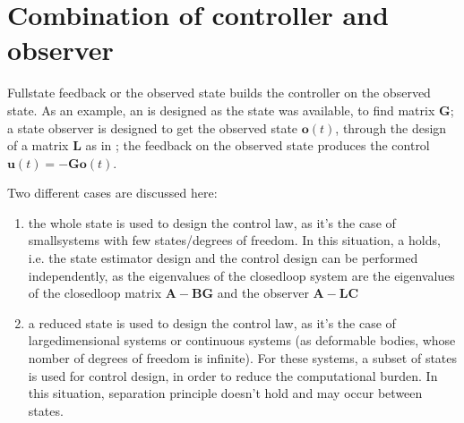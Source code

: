 \documentclass[letterpaper,10pt,english]{jupyterBook}
\begin{document}
\section{Combination of controller and observer}
\label{\detokenize{ch/control/optimal-control-regulator-observer:combination-of-controller-and-observer}}\label{\detokenize{ch/control/optimal-control-regulator-observer:control-controller-observer}}\label{\detokenize{ch/control/optimal-control-regulator-observer::doc}}
\sphinxAtStartPar
Full\sphinxhyphen{}state feed\sphinxhyphen{}back or the observed state builds the controller on the observed state. As an example, an  is designed as the state was available, to find matrix \(\mathbf{G}\); a state observer is designed to get the observed state \(\mathbf{o}(t)\), through the design of a matrix \(\mathbf{L}\) as in {\hyperref[\detokenize{ch/control/kalman:control-kalman}]{}}; the feed\sphinxhyphen{}back on the observed state produces the control \(\mathbf{u}(t) = - \mathbf{G} \mathbf{o}(t)\).

\sphinxAtStartPar
Two different cases are discussed here:
\begin{enumerate}
%
\item {} 
\sphinxAtStartPar
the whole state is used to design the control law, as it’s the case of small\sphinxhyphen{}systems with few states/degrees of freedom. In this situation, a  holds, i.e. the state estimator design and the control design can be performed independently, as the eigenvalues of the closed\sphinxhyphen{}loop system are the eigenvalues of the closed\sphinxhyphen{}loop matrix \(\mathbf{A} - \mathbf{B} \mathbf{G}\) and the observer \(\mathbf{A} - \mathbf{L} \mathbf{C}\)

\item {} 
\sphinxAtStartPar
a reduced state is used to design the control law, as it’s the case of large\sphinxhyphen{}dimensional systems or continuous systems (as deformable bodies, whose nomber of degrees of freedom is infinite). For these systems, a subset of states is used for control design, in order to reduce the computational burden. In this situation, separation principle doesn’t hold and  may occur between states.

\end{enumerate}
\end{document}
